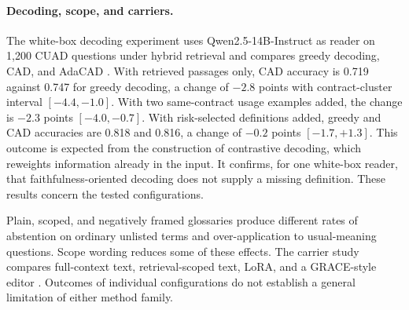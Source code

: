 \paragraph{Decoding, scope, and carriers.}
The white-box decoding experiment uses Qwen2.5-14B-Instruct as reader on 1,200 CUAD questions under hybrid retrieval and compares greedy decoding, CAD, and AdaCAD \citep{cad,adacad}. With retrieved passages only, CAD accuracy is 0.719 against 0.747 for greedy decoding, a change of $-2.8$ points with contract-cluster interval $[-4.4,-1.0]$. With two same-contract usage examples added, the change is $-2.3$ points $[-4.0,-0.7]$. With risk-selected definitions added, greedy and CAD accuracies are 0.818 and 0.816, a change of $-0.2$ points $[-1.7,+1.3]$. This outcome is expected from the construction of contrastive decoding, which reweights information already in the input. It confirms, for one white-box reader, that faithfulness-oriented decoding does not supply a missing definition. These results concern the tested configurations.

Plain, scoped, and negatively framed glossaries produce different rates of abstention on ordinary unlisted terms and over-application to usual-meaning questions. Scope wording reduces some of these effects. The carrier study compares full-context text, retrieval-scoped text, LoRA, and a GRACE-style editor \citep{lora,grace}. Outcomes of individual configurations do not establish a general limitation of either method family.

